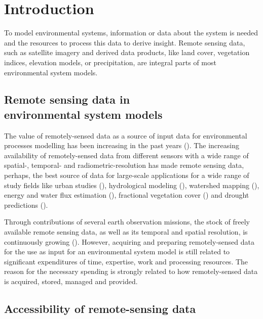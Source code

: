 \documentclass[12pt,twoside,a4paper,final]{report}
\begin{document}
\chapter{Introduction}


To model environmental systems, information or data about the system is needed and the resources to process this data to derive insight. Remote sensing data, such as satellite imagery and derived data products, like land cover, vegetation indices, elevation models, or precipitation, are integral parts of most environmental system models. 

\section{Remote sensing data in \\ environmental system models}

The value of remotely-sensed data as a source of input data for environmental processes modelling has been increasing in the past years (\cite{melesse2007remote}). The increasing availability of remotely-sensed data from different sensors with a wide range of spatial-, temporal-  and radiometric-resolution has made remote sensing data, perhaps, the best source of data for large-scale applications for a wide range of study fields like urban studies (\cite{wu2000global}), hydrological modeling (\cite{bogh2004incorporating}), watershed mapping (\cite{melesse2003spatially}), energy and water flux estimation (\cite{melesse2005estimation}), fractional vegetation cover (\cite{carlson2000impact}) and drought predictions (\cite{rhee2010monitoring}).

Through contributions of several earth observation missions, the stock of freely available remote sensing data, as well as its temporal and spatial resolution, is continuously growing (\cite{melesse2007remote}).
However, acquiring and preparing remotely-sensed data for the use as input for an environmental system model is still related to significant expenditures of time, expertise, work and processing resources. The reason for the necessary spending is strongly related to how remotely-sensed data is acquired, stored, managed and provided.

\section{Accessibility of remote-sensing data}
\end{document}
